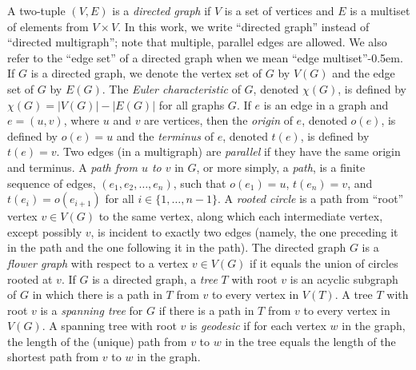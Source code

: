 \documentclass{article}
\begin{document}
A two-tuple $(V, E)$ is a \emph{directed graph} if $V$ is a set of vertices and $E$ is a multiset of elements from $V \times V$.
In this work, we write ``directed graph'' instead of ``directed multigraph''; note that multiple, parallel edges are allowed.
We also refer to the ``edge set'' of a directed graph when we mean ``edge multiset''\kern-0.5em.
If $G$ is a directed graph, we denote the vertex set of $G$ by $V(G)$ and the edge set of $G$ by $E(G)$.
The \emph{Euler characteristic} of $G$, denoted $\chi(G)$, is defined by $\chi(G) = |V(G)| - |E(G)|$ for all graphs $G$.
If $e$ is an edge in a graph and $e = (u, v)$, where $u$ and $v$ are vertices, then the \emph{origin} of $e$, denoted $o(e)$, is defined by $o(e) = u$ and the \emph{terminus} of $e$, denoted $t(e)$, is defined by $t(e) = v$.
Two edges (in a multigraph) are \emph{parallel} if they have the same origin and terminus.
A \emph{path from $u$ to $v$} in $G$, or more simply, a \emph{path}, is a finite sequence of edges, $(e_1, e_2, \dotsc, e_n)$, such that $o(e_1) = u$, $t(e_n) = v$, and $t(e_i) = o(e_{i + 1})$ for all $i \in \{1, \dotsc, n - 1\}$.
A \emph{rooted circle} is a path from ``root'' vertex $v \in V(G)$ to the same vertex, along which each intermediate vertex, except possibly $v$, is incident to exactly two edges (namely, the one preceding it in the path and the one following it in the path).
The directed graph $G$ is a \emph{flower graph} with respect to a vertex $v \in V(G)$ if it equals the union of circles rooted at $v$.
If $G$ is a directed graph, a \emph{tree} $T$ with root $v$ is an acyclic subgraph of $G$ in which there is a path in $T$ from $v$ to every vertex in $V(T)$.
A tree $T$ with root $v$ is a \emph{spanning tree} for $G$ if there is a path in $T$ from $v$ to every vertex in $V(G)$.
A spanning tree with root $v$ is \emph{geodesic} if for each vertex $w$ in the graph, the length of the (unique) path from $v$ to $w$ in the tree equals the length of the shortest path from $v$ to $w$ in the graph.
\end{document}
